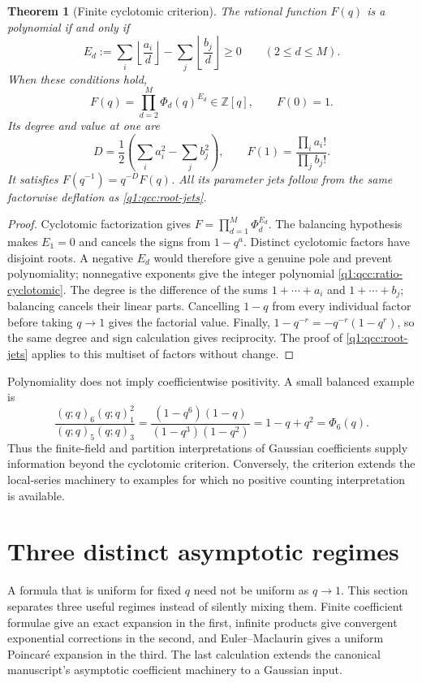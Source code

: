 \documentclass[11pt,a4paper,oneside,openany]{book}
\newtheorem{theorem}{Theorem}[chapter]
\theoremstyle{definition}
\theoremstyle{remark}
\newcommand{\Z}{\mathbb Z}
\begin{document}
\begin{theorem}[Finite cyclotomic criterion]\label{q1:qcc:ratio-criterion}
The rational function \(F(q)\) is a polynomial if and only if
\begin{equation}\label{q1:qcc:ratio-floors}
 E_d:=\sum_i\left\lfloor\frac{a_i}{d}\right\rfloor
       -\sum_j\left\lfloor\frac{b_j}{d}\right\rfloor\ge0
       \qquad(2\le d\le M).
\end{equation}
When these conditions hold,
\begin{equation}\label{q1:qcc:ratio-cyclotomic}
 F(q)=\prod_{d=2}^{M}\Phi_d(q)^{E_d}\in\Z[q],\qquad F(0)=1.
\end{equation}
Its degree and value at one are
\begin{equation}\label{q1:qcc:ratio-degree-value}
 D=\frac12\left(\sum_i a_i^2-\sum_j b_j^2\right),\qquad
 F(1)=\frac{\prod_i a_i!}{\prod_j b_j!}.
\end{equation}
It satisfies \(F(q^{-1})=q^{-D}F(q)\). All its parameter jets follow
from the same factorwise deflation as \cref{q1:qcc:root-jets}.
\end{theorem}
\begin{proof}
Cyclotomic factorization gives \(F=\prod_{d=1}^{M}\Phi_d^{E_d}\).
The balancing hypothesis makes \(E_1=0\) and cancels the signs from
\(1-q^a\). Distinct cyclotomic factors have disjoint roots. A negative
\(E_d\) would therefore give a genuine pole and prevent polynomiality;
nonnegative exponents give the integer polynomial
\eqref{q1:qcc:ratio-cyclotomic}. The degree is the difference of the sums
\(1+\cdots+a_i\) and \(1+\cdots+b_j\); balancing cancels their linear
parts. Cancelling \(1-q\) from every individual factor before taking
\(q\to1\) gives the factorial value. Finally,
\(1-q^{-r}=-q^{-r}(1-q^r)\), so the same degree and sign calculation
gives reciprocity. The proof of \cref{q1:qcc:root-jets} applies to this
multiset of factors without change.
\end{proof}

Polynomiality does not imply coefficientwise positivity. A small balanced
example is
\[
 \frac{(q;q)_6(q;q)_1^2}{(q;q)_5(q;q)_3}
 =\frac{(1-q^6)(1-q)}{(1-q^3)(1-q^2)}
 =1-q+q^2=\Phi_6(q).
\]
Thus the finite-field and partition interpretations of Gaussian coefficients
supply information beyond the cyclotomic criterion. Conversely, the criterion
extends the local-series machinery to examples for which no positive counting
interpretation is available.
\chapter{Three distinct asymptotic regimes}
\label{q3:sec:asymptotic}
A formula that is uniform for fixed $q$ need not be uniform as $q\to1$.
This section separates three useful regimes instead of silently mixing
them. Finite coefficient formulae give an exact expansion in the first,
infinite products give convergent exponential corrections in the
second, and Euler--Maclaurin gives a uniform Poincar\'e expansion in the
third. The last calculation extends the canonical manuscript's asymptotic
coefficient machinery to a Gaussian input.
\end{document}
